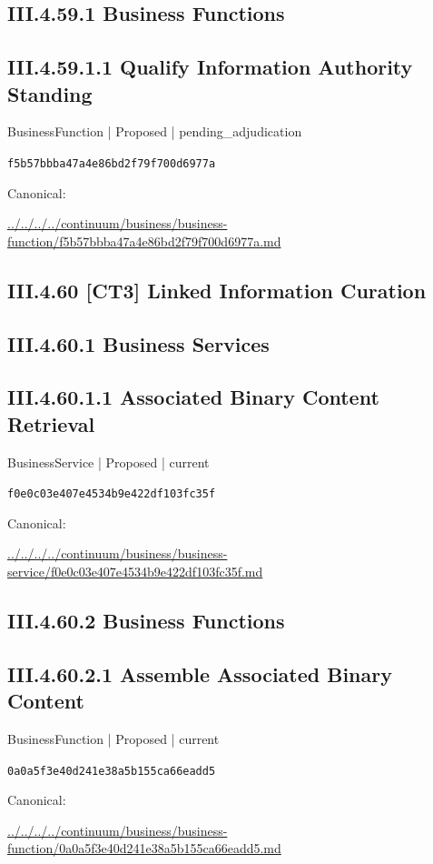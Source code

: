 \documentclass[10pt,a4paper]{article}
\begin{document}
\subsection*{III.4.59.1 Business Functions}
\subsection*{III.4.59.1.1 Qualify Information Authority Standing}
{\small BusinessFunction | Proposed | pending\_adjudication}\par
\texttt{f5b57bbba47a4e86bd2f79f700d6977a}\par
Canonical: \par
{\footnotesize\url{../../../../continuum/business/business-function/f5b57bbba47a4e86bd2f79f700d6977a.md}}\par
\subsection*{III.4.60 [CT3] Linked Information Curation}
\subsection*{III.4.60.1 Business Services}
\subsection*{III.4.60.1.1 Associated Binary Content Retrieval}
{\small BusinessService | Proposed | current}\par
\texttt{f0e0c03e407e4534b9e422df103fc35f}\par
Canonical: \par
{\footnotesize\url{../../../../continuum/business/business-service/f0e0c03e407e4534b9e422df103fc35f.md}}\par
\subsection*{III.4.60.2 Business Functions}
\subsection*{III.4.60.2.1 Assemble Associated Binary Content}
{\small BusinessFunction | Proposed | current}\par
\texttt{0a0a5f3e40d241e38a5b155ca66eadd5}\par
Canonical: \par
{\footnotesize\url{../../../../continuum/business/business-function/0a0a5f3e40d241e38a5b155ca66eadd5.md}}\par
\end{document}
